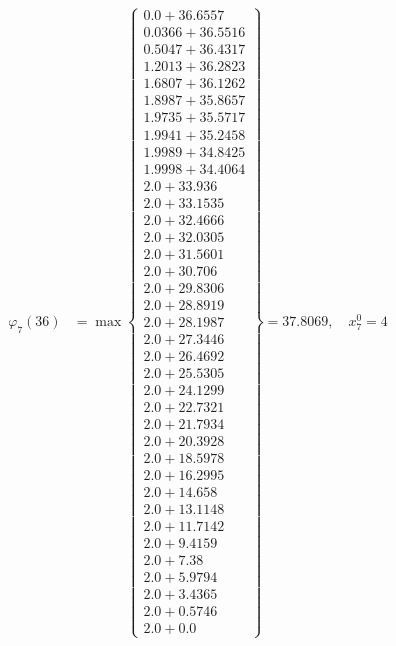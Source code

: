 \documentclass{article}
\begin{document}
\begin{align*}
\varphi_{7}(36) &= \max \left\{ \begin{array}{c}
0.0 + 36.6557 \\
 0.0366 + 36.5516 \\
 0.5047 + 36.4317 \\
 1.2013 + 36.2823 \\
 1.6807 + 36.1262 \\
 1.8987 + 35.8657 \\
 1.9735 + 35.5717 \\
 1.9941 + 35.2458 \\
 1.9989 + 34.8425 \\
 1.9998 + 34.4064 \\
 2.0 + 33.936 \\
 2.0 + 33.1535 \\
 2.0 + 32.4666 \\
 2.0 + 32.0305 \\
 2.0 + 31.5601 \\
 2.0 + 30.706 \\
 2.0 + 29.8306 \\
 2.0 + 28.8919 \\
 2.0 + 28.1987 \\
 2.0 + 27.3446 \\
 2.0 + 26.4692 \\
 2.0 + 25.5305 \\
 2.0 + 24.1299 \\
 2.0 + 22.7321 \\
 2.0 + 21.7934 \\
 2.0 + 20.3928 \\
 2.0 + 18.5978 \\
 2.0 + 16.2995 \\
 2.0 + 14.658 \\
 2.0 + 13.1148 \\
 2.0 + 11.7142 \\
 2.0 + 9.4159 \\
 2.0 + 7.38 \\
 2.0 + 5.9794 \\
 2.0 + 3.4365 \\
 2.0 + 0.5746 \\
 2.0 + 0.0
\end{array} \right\}=37.8069, \quad x_{7}^0=4\\
  
 \\ 
\end{align*}
\end{document}

